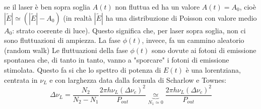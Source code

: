 \documentclass{book}
\def \D {\Delta}
\theoremstyle{remark}
\begin{document}
se il laser è ben sopra soglia $A(t)$ non fluttua ed ha un valore $A(t) = A_0$, cioè $\left|\tilde{E}\right| \simeq \left(\left|\tilde{E}\right| - A_0\right)$
(in realtà $\left|\tilde{E}\right|$ ha una distribuzione di Poisson con valore medio $A_0$: strato coerente di luce). Questo significa che, per laser sopra soglia, non ci sono fluttuazioni di ampiezza. La fase $\phi(t)$, invece, fa un cammino aleatorio (random walk)
Le fluttuazioni della fase $\phi(t)$ sono dovute ai fotoni di emissione spontanea che, di tanto in tanto, vanno a "sporcare" i fotoni di emissione stimolata. Questo fa si che lo spettro di potenza di $E(t)$ è una lorentziana, centrata in $\nu_L$ e con larghezza data dalla formula di Scharlow e Townes:
\begin{equation*}
\D\nu_L = \frac{N_2}{N_2 - N_1} \frac{2\pi h\nu_L (\D\nu_c)^2}{P_{out}} \underbrace{\simeq}_{N_1 \simeq 0} \frac{2\pi h \nu_L (\D\nu_c)^2}{P_{out}}
\end{equation*}
\end{document}

